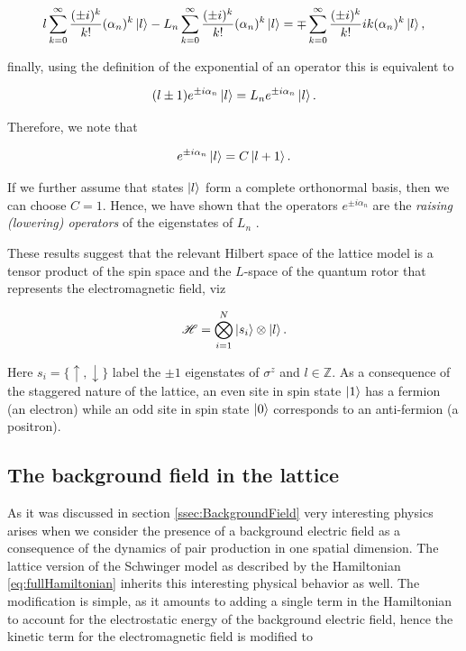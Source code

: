  \begin{equation}
 l\sum_{k=0}^\infty\frac{(\pm i)^k}{k!} (\alpha_n)^k \ket{l} - L_n \sum_{k=0}^\infty\frac{(\pm i)^k}{k!} (\alpha_n)^k \ket{l}  = \mp \sum_{k=0}^\infty\frac{(\pm i)^k}{k!} i k (\alpha_n)^{k}\ket{l},
 \end{equation}
 
 finally, using the definition of the exponential of an operator this is equivalent to
 
 \begin{equation}
 (l\pm1)e^{\pm i\alpha_n}\ket{l} = L_n e^{\pm i\alpha_n}\ket{l}.
 \end{equation}
 
 Therefore, we note that 
 
 \begin{equation}
 e^{\pm i\alpha_n}\ket{l} = C \ket{l+1}.
 \end{equation}
 
 If we further assume that states $\ket{l}$ form a complete orthonormal basis, then we can choose $C=1$. Hence, we have shown that the operators $e^{\pm i\alpha_n}$ are the \emph{raising (lowering) operators} of the eigenstates of $L_n$ \cite{Banks}.

These results suggest that the relevant Hilbert space of the lattice model is a tensor product of the spin space and the $L$-space of the quantum rotor that represents the electromagnetic field, viz

\begin{equation}
    \mathscr{H} =\bigotimes_{i=1}^N\ket{s_i}\otimes \ket{l}.
\end{equation}

Here $s_i=\{\uparrow,\downarrow\}$ label the $\pm1$ eigenstates of $\sigma^z$ and $l\in\mathbb{Z}$. As a consequence of the staggered nature of the lattice, an even site in spin state $\ket{1}$ has a fermion (an electron) while an odd site in spin state $\ket{0}$ corresponds to an anti-fermion (a positron).

\subsection{The background field in the lattice}

As it was discussed in section \ref{ssec:BackgroundField} very interesting physics arises when we consider the presence of a background electric field as a consequence of the dynamics of pair production in one spatial dimension. The lattice version of the Schwinger model as described by the Hamiltonian \eqref{eq:fullHamiltonian} inherits this interesting physical behavior as well. The modification is simple,  as it amounts to adding a single term in the Hamiltonian to account for the electrostatic energy of the background electric field, hence the kinetic term for the electromagnetic field is modified to

